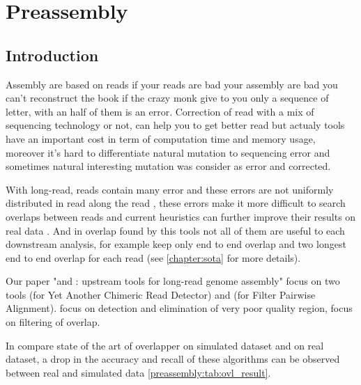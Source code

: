 \documentclass[main.tex]{subfiles}
\begin{document}
\chapter{Preassembly}\label{chapter:preassembly}

\section{Introduction}

Assembly are based on reads if your reads are bad your assembly are bad you can't reconstruct the book if the crazy monk give to you only a sequence of letter, with an half of them is an error. Correction of read with a mix of sequencing technology or not, can help you to get better read but actualy tools have an important cost in term of computation time and memory usage, moreover it's hard to differentiate natural mutation to sequencing error and sometimes natural interesting mutation was consider as error and corrected.

With long-read, reads contain many error and these errors are not uniformly distributed in read along the read \cite{blog_post_error_repartition}, these errors make it more difficult to search overlaps between reads and current heuristics can further improve their results on real data \cite{ovl_bench}.
And in overlap found by this tools not all of them are useful to each downstream analysis, for example \miniasm keep only end to end overlap and \canu two longest end to end overlap for each read (see \ref{chapter:sota} for more details).

Our paper "\yacrd and \fpa: upstream tools for long-read genome assembly" focus on two tools \yacrd (for Yet Another Chimeric Read Detector) and \fpa (for Filter Pairwise Alignment). \yacrd focus on detection and elimination of very poor quality region, \fpa focus on filtering of overlap.

In \cite{ovl_bench} \citeauthor{ovl_bench} compare state of the art of overlapper on simulated dataset and on real dataset, a drop in the accuracy and recall of these algorithms can be observed between real and simulated data \ref{preassembly:tab:ovl_result}.
\end{document}

